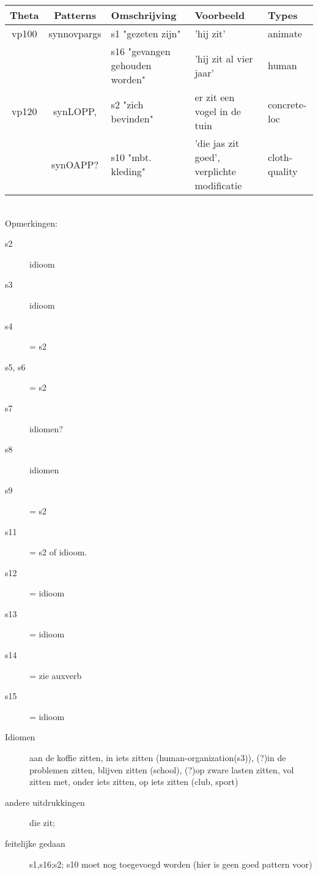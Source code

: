 \begin{tabular}[t]{|c|c|p{}|p{}|p{}|}
\hline
Theta & Patterns &  Omschrijving & Voorbeeld & Types\\
\hline
vp100 & synnovpargs & s1 "gezeten zijn" & {'hij zit'} & animate\\
      &             & s16 "gevangen gehouden worden" & {'hij zit al vier jaar'}& human\\
vp120 & synLOPP,    & s2 "zich bevinden" & er zit een vogel in de tuin & concrete-loc\\
      & synOAPP?    & s10 "mbt. kleding" & {'die jas zit goed', verplichte modificatie}& cloth-quality\\
\hline
\end{tabular}\\

Opmerkingen:
\begin{description}
  \item[s2] idioom
  \item[s3] idioom
  \item[s4] = s2
  \item[s5, s6] = s2
  \item[s7] idiomen?
  \item[s8] idiomen
  \item[s9] = s2
  \item[s11] = s2 of idioom.
  \item[s12] = idioom
  \item[s13] = idioom
  \item[s14] = zie auxverb
  \item[s15] = idioom
\end{description}


\begin{description}
  \item[Idiomen] aan de koffie zitten, in iets zitten (human-organization(s3)), (?)in de problemen zitten, blijven zitten
(school),
(?)op zware lasten zitten, vol zitten met, onder iets zitten, op iets zitten (club, sport)

  \item[andere uitdrukkingen] die zit;
\end{description}

\begin{description}
\item[feitelijke gedaan] s1,s16;s2; s10 moet nog toegevoegd worden (hier is
geen goed pattern voor)
\end{description}


